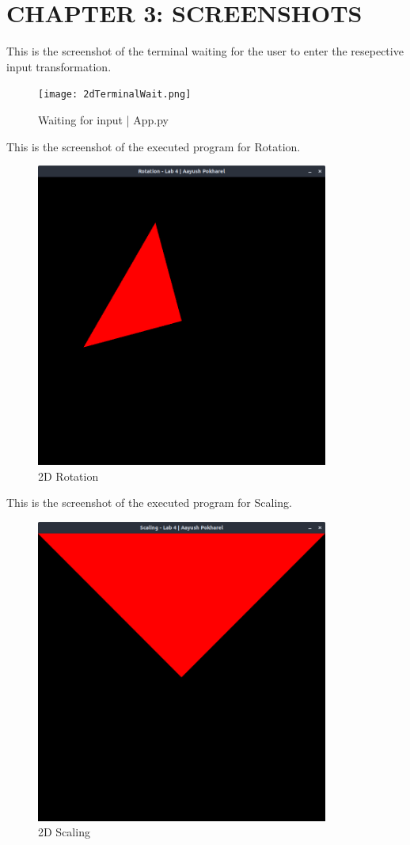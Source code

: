 \documentclass[12pt]{article}
\begin{document}
\section{CHAPTER 3: SCREENSHOTS}
This is the screenshot of the terminal waiting for the user to enter the resepective input transformation.
\begin{figure}[h]
    \centerline{\texttt{[image: 2dTerminalWait.png]}}
    \caption{Waiting for input | App.py}
    \label{fig}
\end{figure}
\clearpage
This is the screenshot of the executed program for Rotation.
\begin{figure}[h]
    \centerline{\includegraphics[height=100mm]{2dRotation.png}}
    \caption{2D Rotation}
    \label{fig}
\end{figure}
\clearpage
This is the screenshot of the executed program for Scaling.
\begin{figure}[h]
    \centerline{\includegraphics[height=100mm]{2dScaling.png}}
    \caption{2D Scaling}
    \label{fig}
\end{figure}
\end{document}
